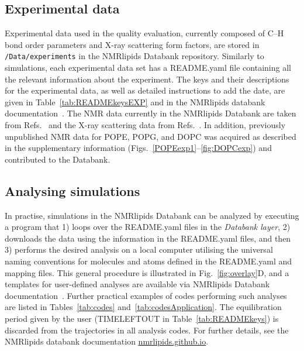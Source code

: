 \documentclass[fleqn,10pt]{wlscirep}
\begin{document}
\subsection{Experimental data}
Experimental data used in the quality evaluation, currently composed of C--H bond order parameters and X-ray scattering form factors, are stored in \texttt{/Data/experiments} in the NMRlipids Databank repository. Similarly to simulations, each experimental data set has a README.yaml file containing all the relevant information about the experiment. The keys and their descriptions for the experimental data, as well as detailed instructions to add the date, are given in Table~\ref{tab:READMEkeysEXP} and in the NMRlipids databank documentation~\cite{NMRlipidsExperimentalData}. The NMR data currently in the NMRlipids Databank are taken from Refs.~ and the X-ray scattering data from Refs.~. In addition, previously unpublished NMR data for POPE, POPG, and DOPC was acquired as described in the supplementary information (Figs.~\ref{POPEexp1}--\ref{fig:DOPCexp}) and contributed to the Databank. 


\subsection{Analysing simulations}
In practise, simulations in the NMRlipids Databank can be analyzed by executing a program that
1) loops over the README.yaml files in the {\it Databank layer},
2) downloads the data using the information in the README.yaml files, and then
3) performs the desired analysis on a local computer utilising the universal naming conventions for molecules and atoms defined in the README.yaml and mapping files.
This general procedure is illustrated in Fig.~\ref{fig:overlay}D, and a templates for user-defined analyses are available via NMRlipids Databank documentation~\cite{NMRlipidsExampleAndTutorials}. Further practical examples of codes performing such analyses are listed in Tables~\ref{tab:codes} and~\ref{tab:codesApplication}.  The equilibration period given by the user (TIMELEFTOUT in Table~\ref{tab:READMEkeys}) is discarded from the trajectories in all analysis codes. For further details, see the NMRlipids databank documentation \href{https://nmrlipids.github.io/}{nmrlipids.github.io}. 
\end{document}
